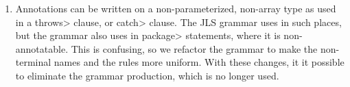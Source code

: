 \documentclass[10pt]{article}
\begin{document}
\begin{enumerate}
\begin{enumerate}
% 
% 

\item
Annotations can be written on a non-parameterized, non-array type as used
in a \<throws> clause, or \<catch> clause.
The JLS grammar uses  in such places, but the
grammar also uses  in \<package> statements, where
it is non-annotatable.  This is confusing, so we refactor the grammar to
make the non-terminal names and the rules more uniform.  With these
changes, it it possible to eliminate the 
grammar production, which is no longer used.

\label{sec:qualified-type-list}


\end{enumerate}
\end{enumerate}
\end{document}
